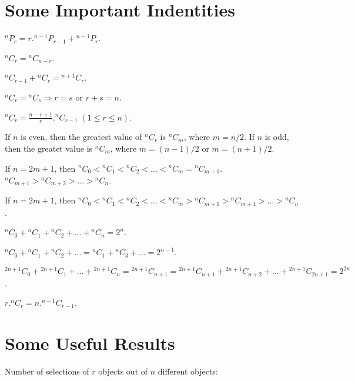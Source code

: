 \section{Some Important Indentities}
\startitemize[n]
\item ${}^nP_r = r.{}^{n - 1}P_{r - 1} + {}^{n - 1}P_r$.
\item ${}^nC_r = {}^nC_{n - r}$.
\item ${}^nC_{r - 1} + {}^nC_r = {}^{n + 1}C_r$.
\item ${}^nC_r = {}^nC_s \Rightarrow r = s$ or $r + s = n$.
\item ${}^nC_r = \frac{n - r + 1}{r}.{}^nC_{r - 1}\;(1\leq r\leq n)$.
\item If $n$ is even, then the greatest value of ${}^nC_r$ is ${}^nC_m$, where $m = n/2$. If $n$ is odd, then the greatet value is
  ${}^nC_m$, where $m = (n - 1)/2$ or $m = (n + 1)/2$.
\item If $n = 2m + 1$, then ${}^nC_0 < {}^nC_1 < {}^nC_2 < \ldots < {}^nC_m = {}^nC_{m + 1}$. ${}^nC_{m + 1} > {}^nC_{m + 2} >
  \ldots > {}^nC_n$.
\item If $n = 2m + 1$, then ${}^nC_0 < {}^nC_1 < {}^nC_2 < \ldots <{}^nC_m > {}^nC_{m + 1} > {}^nC_{m + 1} > \ldots > {}^nC_n$.
\item ${}^nC_0 + {}^nC_1 + {}^nC_2 + \ldots + {}^nC_n = 2^n$.
\item ${}^nC_0 + {}^nC_1 + {}^nC_2 + \ldots = {}^nC_1 + {}^nC_3 + \ldots = 2^{n -1}$.
\item ${}^{2n + 1}C_0 + {}^{2n + 1}C_1 + \ldots + {}^{2n + 1}C_n = {}^{2n + 1}C_{n + 1} = {}^{2n + 1}C_{n + 1} + {}^{2n + 1}C_{n +
  2} + \ldots + {}^{2n + 1}C_{2n + 1} = 2^{2n}$.
\item $r.{}^nC_r = n.{}^{n - 1}C_{r - 1}$.
\stopitemize

\section{Some Useful Results}
Number of selections of $r$ objects out of $n$ different objects:

